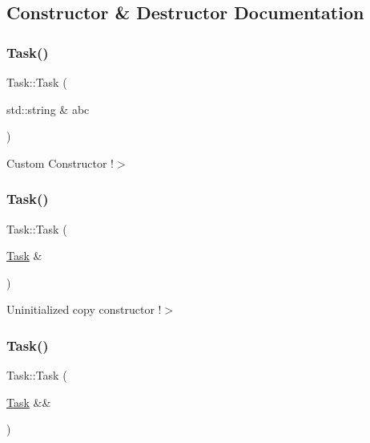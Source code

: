 \subsection{Constructor \& Destructor Documentation}
\mbox{\label{class_task_a43834b15cba574ccd4f25af665649776}} 
\subsubsection{\texorpdfstring{Task()}{Task()}\hspace{0.1cm}{\footnotesize\ttfamily [1/3]}}
{\footnotesize\ttfamily Task\+::\+Task (\begin{DoxyParamCaption}\item[{std\+::string \&}]{abc }\end{DoxyParamCaption})}

Custom Constructor !$>$ \mbox{\label{class_task_a60073fae7e07b8d1721b1bc73adcc6c8}} 
\subsubsection{\texorpdfstring{Task()}{Task()}\hspace{0.1cm}{\footnotesize\ttfamily [2/3]}}
{\footnotesize\ttfamily Task\+::\+Task (\begin{DoxyParamCaption}\item[{\mbox{\hyperlink{class_task}{Task}} \&}]{ }\end{DoxyParamCaption})\hspace{0.3cm}{\ttfamily [delete]}}

Uninitialized copy constructor !$>$ \mbox{\label{class_task_ae146c98551f244f62b93bc7b4e334580}} 
\subsubsection{\texorpdfstring{Task()}{Task()}\hspace{0.1cm}{\footnotesize\ttfamily [3/3]}}
{\footnotesize\ttfamily Task\+::\+Task (\begin{DoxyParamCaption}\item[{\mbox{\hyperlink{class_task}{Task}} \&\&}]{ }\end{DoxyParamCaption})\hspace{0.3cm}{\ttfamily [delete]}}

